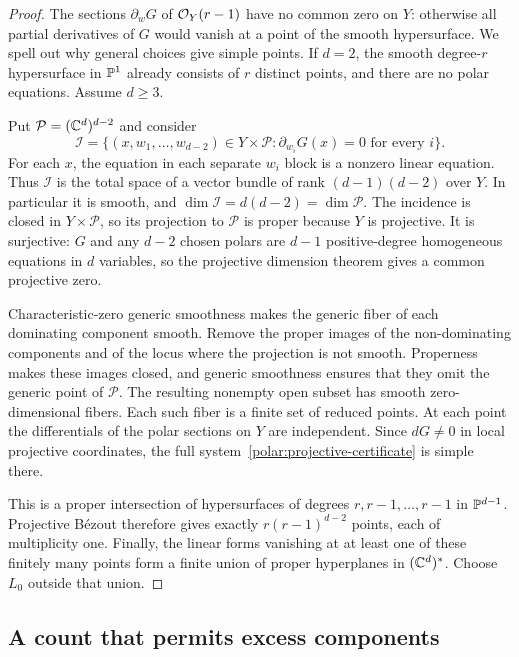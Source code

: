 \begin{proof}
The sections $\partial_wG$ of $\mathcal O_Y(r-1)$ have no common zero on $Y$:
otherwise all partial derivatives of $G$ would vanish at a point of the
smooth hypersurface. We spell out why general choices give simple points.
If $d=2$, the smooth degree-$r$ hypersurface in $\mathbb P^1$ already consists
of $r$ distinct points, and there are no polar equations. Assume $d\ge3$.

Put $\mathcal P=(\mathbb C^d)^{d-2}$ and consider
\[
 \mathcal I=\{(x,w_1,\ldots,w_{d-2})\in Y\times\mathcal P:
                  \partial_{w_i}G(x)=0\text{ for every }i\}.
\]
For each $x$, the equation in each separate $w_i$ block is a nonzero
linear equation. Thus $\mathcal I$ is the total space of a vector bundle
of rank $(d-1)(d-2)$ over $Y$. In particular it is smooth, and
$\dim\mathcal I=d(d-2)=\dim\mathcal P$. The incidence is closed in
$Y\times\mathcal P$, so its projection to $\mathcal P$ is proper because
$Y$ is projective. It is surjective: $G$ and any
$d-2$ chosen polars are $d-1$ positive-degree homogeneous equations in
$d$ variables, so the projective dimension theorem gives a common
projective zero.

Characteristic-zero generic smoothness makes the generic fiber of each
dominating component smooth. Remove the proper images of the
non-dominating components and of the locus where the projection is not
smooth. Properness makes these images closed, and generic smoothness
ensures that they omit the generic point of $\mathcal P$. The resulting
nonempty open subset has smooth zero-dimensional fibers. Each such fiber
is a finite set of reduced points. At each point the differentials of the polar
sections on $Y$ are independent. Since $dG\ne0$ in local projective
coordinates, the full system~\eqref{polar:projective-certificate} is
simple there.

This is a proper intersection of hypersurfaces of degrees
$r,r-1,\ldots,r-1$ in $\mathbb P^{d-1}$. Projective B\'ezout therefore gives
exactly $r(r-1)^{d-2}$ points, each of multiplicity one.
Finally, the linear forms vanishing at at least one of these finitely
many points form a finite union of proper hyperplanes in $(\mathbb C^d)^*$.
Choose $L_0$ outside that union.
\end{proof}

\subsection{A count that permits excess components}

